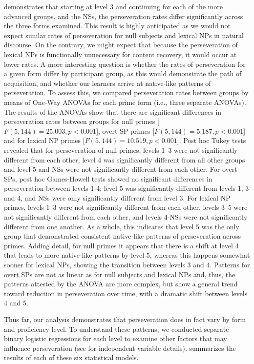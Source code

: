 \documentclass[output=paper]{langscibook}
\begin{document}
 demonstrates that starting at level 3 and continuing for each of the more advanced groups, and the NSs, the perseveration rates differ significantly across the three forms examined. This result is highly anticipated as we would not expect similar rates of perseveration for null subjects and lexical NPs in natural discourse. On the contrary, we might expect that because the perseveration of lexical NPs is functionally unnecessary for content recovery, it would occur at lower rates. A more interesting question is whether the rates of perseveration for a given form differ by participant group, as this would demonstrate the path of acquisition, and whether our learners arrive at native-like patterns of perseveration. To assess this, we compared perseveration rates between groups by means of One-Way ANOVAs for each prime form (i.e., three separate ANOVAs). The results of the ANOVAs show that there are significant differences in perseveration rates between groups for null primes [$F (5, 144) = 25.003,\allowbreak p<0.001$], overt SP primes [$F (5,144) = 5.187,\allowbreak p<0.001$] and for lexical NP primes [$F (5,144) = 10.519,\allowbreak p<0.001$]. Post hoc Tukey tests revealed that for perseveration of null primes, levels 1–3 were not significantly different from each other, level 4 was significantly different from all other groups and level 5 and NSs were not significantly different from each other. For overt SPs, post hoc Games-Howell tests showed no significant differences in perseveration between levels 1-4; level 5 was significantly different from levels 1, 3 and 4, and NSs were only significantly different from level 3. For lexical NP primes, levels 1–3 were not significantly different from each other, levels 3–5 were not significantly different from each other, and levels 4-NSs were not significantly different from one another. As a whole, this indicates that level 5 was the only group that demonstrated consistent native-like patterns of perseveration across primes. Adding detail, for null primes it appears that there is a shift at level 4 that leads to more native-like patterns by level 5, whereas this happens somewhat sooner for lexical NPs, showing the transition between levels 3 and 4. Patterns for overt SPs are not as linear as for null subjects and lexical NPs and, thus, the patterns attested by the ANOVA are more complex, but show a general trend toward reduction in perseveration over time, with a dramatic shift between levels 4 and 5.



Thus far, our analysis demonstrates that perseveration does in fact vary by form and proficiency level. To understand these patterns, we conducted separate binary logistic regressions for each level to examine other factors that may influence perseveration (see  for independent variable details).   summarizes the results of each of these six statistical models. 
\end{document}
